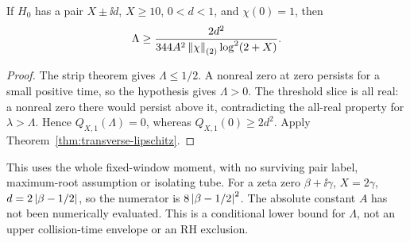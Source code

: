 \begin{corollary}\label{cor:threshold-lower}
If \(H_0\) has a pair \(X\pm\ii d\), \(X\ge10\), \(0<d<1\),
and \(\chi(0)=1\), then
\begin{equation}\label{eq:threshold-lower}
 \Lambda\ge
 \frac{2d^2}{344A^2\left\lVert\chi\right\rVert_{(2)}\log^2(2+X)}.
\end{equation}
\end{corollary}
\begin{proof}
The strip theorem gives \(\Lambda\le1/2\). A nonreal zero at zero
persists for a small positive time, so the hypothesis gives
\(\Lambda>0\). The threshold slice is all real: a nonreal zero there
would persist above it, contradicting the all-real property for
\(\lambda>\Lambda\). Hence \(Q_{X,1}(\Lambda)=0\), whereas
\(Q_{X,1}(0)\ge2d^2\). Apply Theorem~\ref{thm:transverse-lipschitz}.
\end{proof}
This uses the whole fixed-window moment, with no surviving pair label,
maximum-root assumption or isolating tube. For a zeta zero
\(\beta+\ii\gamma\), \(X=2\gamma\), \(d=2\left|\beta-1/2\right|\),
so the numerator is \(8\left|\beta-1/2\right|^2\). The absolute constant
\(A\) has not been numerically evaluated. This is a conditional lower
bound for \(\Lambda\), not an upper collision-time envelope or an RH
exclusion.
